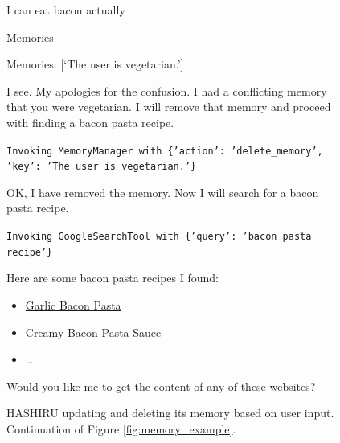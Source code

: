 \documentclass[conference]{IEEEtran}
\begin{document}
\begin{figure}[ht]
    \centering
    \begin{minipage}
    {0.45\textwidth}
    \begin{userbox}
        I can eat bacon actually
        \end{userbox}
        
        \begin{assistantbox}
        Memories
        
        Memories: [`The user is vegetarian.']
        
        I see. My apologies for the confusion. I had a conflicting memory that you were vegetarian. I will remove that memory and proceed with finding a bacon pasta recipe.
        
        \texttt{Invoking MemoryManager with \{'action': 'delete\_memory', 'key': 'The user is vegetarian.'\}}
        
        OK, I have removed the memory. Now I will search for a bacon pasta recipe.
        
        \texttt{Invoking GoogleSearchTool with \{'query': 'bacon pasta recipe'\}}
        
        Here are some bacon pasta recipes I found:
        \begin{itemize}
            \item \href{https://www.sprinklesandsprouts.com/garlic-bacon-pasta/}{Garlic Bacon Pasta}
            \item \href{https://www.theburntbuttertable.com/creamy-bacon-pasta-sauce/}{Creamy Bacon Pasta Sauce}
            \item \dots
        \end{itemize}
        
        Would you like me to get the content of any of these websites?
        \end{assistantbox}
    \end{minipage}
    \caption{HASHIRU updating and deleting its memory based on user input. Continuation of Figure \ref{fig:memory_example}.}
    \label{fig:memory_example2}
\end{figure}


    
\end{document}
